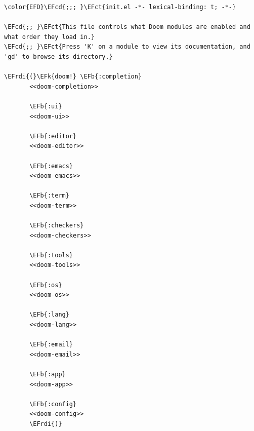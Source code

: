 \documentclass{scrartcl}
\newcommand{\EFk}[1]{\textcolor{EFk}{#1}} %
\newcommand{\EFb}[1]{\textcolor{EFb}{#1}} %
\newcommand{\EFct}[1]{\textcolor{EFct}{#1}} %
\newcommand{\EFcd}[1]{\textcolor{EFcd}{#1}} %
\newcommand{\EFrdi}[1]{\textcolor{EFrdi}{#1}} %
\begin{document}
\begin{Code}
\begin{Verbatim}[]
\color{EFD}\EFcd{;;; }\EFct{init.el -*- lexical-binding: t; -*-}

\EFcd{;; }\EFct{This file controls what Doom modules are enabled and what order they load in.}
\EFcd{;; }\EFct{Press 'K' on a module to view its documentation, and 'gd' to browse its directory.}

\EFrdi{(}\EFk{doom!} \EFb{:completion}
       <<doom-completion>>

       \EFb{:ui}
       <<doom-ui>>

       \EFb{:editor}
       <<doom-editor>>

       \EFb{:emacs}
       <<doom-emacs>>

       \EFb{:term}
       <<doom-term>>

       \EFb{:checkers}
       <<doom-checkers>>

       \EFb{:tools}
       <<doom-tools>>

       \EFb{:os}
       <<doom-os>>

       \EFb{:lang}
       <<doom-lang>>

       \EFb{:email}
       <<doom-email>>

       \EFb{:app}
       <<doom-app>>

       \EFb{:config}
       <<doom-config>>
       \EFrdi{)}
\end{Verbatim}
\end{Code}
\end{document}
